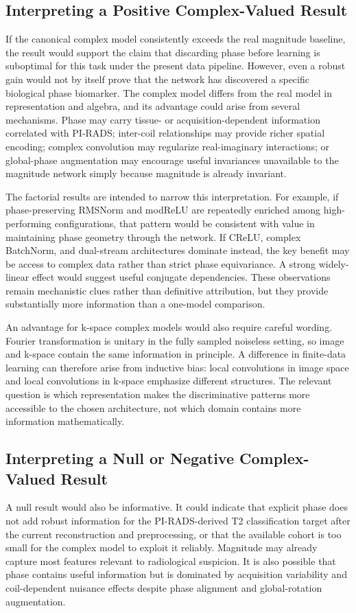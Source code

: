 \documentclass[journal]{IEEEtran}
\begin{document}
\subsection{Interpreting a Positive Complex-Valued Result}
If the canonical complex model consistently exceeds the real magnitude baseline, the result would support the claim that discarding phase before learning is suboptimal for this task under the present data pipeline. However, even a robust gain would not by itself prove that the network has discovered a specific biological phase biomarker. The complex model differs from the real model in representation and algebra, and its advantage could arise from several mechanisms. Phase may carry tissue- or acquisition-dependent information correlated with PI-RADS; inter-coil relationships may provide richer spatial encoding; complex convolution may regularize real-imaginary interactions; or global-phase augmentation may encourage useful invariances unavailable to the magnitude network simply because magnitude is already invariant.

The factorial results are intended to narrow this interpretation. For example, if phase-preserving RMSNorm and modReLU are repeatedly enriched among high-performing configurations, that pattern would be consistent with value in maintaining phase geometry through the network. If CReLU, complex BatchNorm, and dual-stream architectures dominate instead, the key benefit may be access to complex data rather than strict phase equivariance. A strong widely-linear effect would suggest useful conjugate dependencies. These observations remain mechanistic clues rather than definitive attribution, but they provide substantially more information than a one-model comparison.

An advantage for k-space complex models would also require careful wording. Fourier transformation is unitary in the fully sampled noiseless setting, so image and k-space contain the same information in principle. A difference in finite-data learning can therefore arise from inductive bias: local convolutions in image space and local convolutions in k-space emphasize different structures. The relevant question is which representation makes the discriminative patterns more accessible to the chosen architecture, not which domain contains more information mathematically.

\subsection{Interpreting a Null or Negative Complex-Valued Result}
A null result would also be informative. It could indicate that explicit phase does not add robust information for the PI-RADS-derived T2 classification target after the current reconstruction and preprocessing, or that the available cohort is too small for the complex model to exploit it reliably. Magnitude may already capture most features relevant to radiological suspicion. It is also possible that phase contains useful information but is dominated by acquisition variability and coil-dependent nuisance effects despite phase alignment and global-rotation augmentation.
\end{document}
